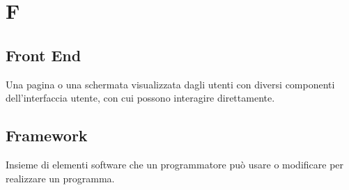 \chapter{F}

\section{Front End}
Una pagina o una schermata visualizzata dagli utenti con diversi componenti dell'interfaccia utente, con cui possono interagire direttamente.

\section{Framework}
Insieme di elementi software che un programmatore può usare o modificare per realizzare un programma.
